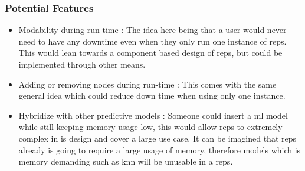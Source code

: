 	\subsubsection{Potential Features}
		\begin{itemize}
			\item Modability during run-time : The idea here being that a user would never need to have any downtime even when they only run one instance of \gls{reps}. This would lean towards a component based design of \gls{reps}, but could be implemented through other means.
			\item Adding or removing nodes during run-time : This comes with the same general idea which could reduce down time when using only one instance.
			\item Hybridize with other predictive models : Someone could insert a \gls{ml} model while still keeping memory usage low, this would allow \gls{reps} to extremely complex in is design and cover a large use case. It can be imagined that \gls{reps} already is going to require a large usage of memory, therefore models which is memory demanding such as \gls{knn} will be unusable in a \gls{reps}.
		\end{itemize}
	
